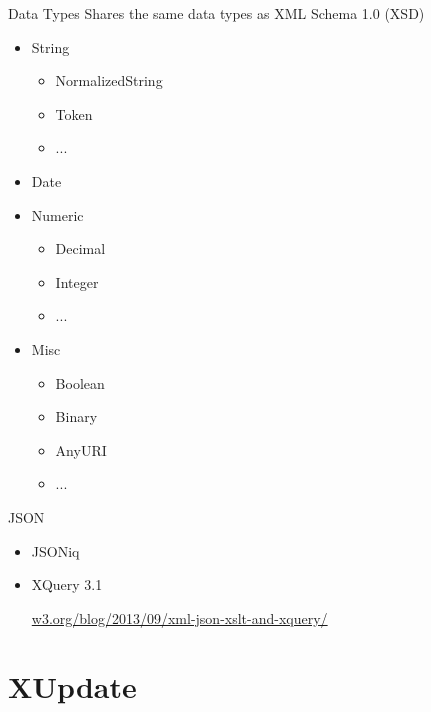 \documentclass[sans]{beamer}
\begin{document}
\begin{frame}{Data Types}
	Shares the same data types as XML Schema 1.0 (XSD)

	\begin{itemize}
		\item String
			\begin{itemize}
				\item NormalizedString
				\item Token
				\item ...
			\end{itemize}
		\item Date
		\item Numeric
			\begin{itemize}
				\item Decimal
				\item Integer
				\item ...
			\end{itemize}
		\item Misc
			\begin{itemize}
				\item Boolean
				\item Binary
				\item AnyURI
				\item ...
			\end{itemize}
	\end{itemize}
\end{frame}

\begin{frame}{JSON}
	\begin{itemize}
		\item JSONiq
		\item XQuery 3.1

		\color{blue} \url{w3.org/blog/2013/09/xml-json-xslt-and-xquery/} \color{black}
	\end{itemize}
\end{frame}


\section{XUpdate}
\end{document}
